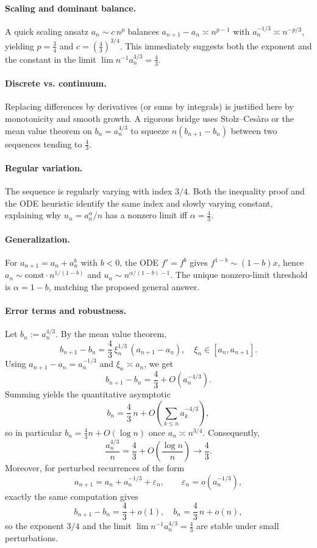 \documentclass{article}
\begin{document}
\paragraph{Scaling and dominant balance.}
A quick scaling ansatz $a_n \sim c\,n^p$ balances $a_{n+1}-a_n \asymp n^{p-1}$ with $a_n^{-1/3} \asymp n^{-p/3}$, yielding $p=\tfrac{3}{4}$ and $c=(\tfrac{4}{3})^{3/4}$. This immediately suggests both the exponent and the constant in the limit $\lim n^{-1}a_n^{4/3}=\tfrac{4}{3}$.

\paragraph{Discrete vs. continuum.}
Replacing differences by derivatives (or sums by integrals) is justified here by monotonicity and smooth growth. A rigorous bridge uses Stolz–Cesàro or the mean value theorem on $b_n=a_n^{4/3}$ to squeeze $n(b_{n+1}-b_n)$ between two sequences tending to $\tfrac{4}{3}$.

\paragraph{Regular variation.}
The sequence is regularly varying with index $3/4$. Both the inequality proof and the ODE heuristic identify the same index and slowly varying constant, explaining why $u_n=a_n^\alpha/n$ has a nonzero limit iff $\alpha=\tfrac{4}{3}$.

\paragraph{Generalization.}
For $a_{n+1}=a_n+a_n^b$ with $b<0$, the ODE $f'=f^b$ gives $f^{1-b}\sim (1-b)x$, hence $a_n\sim \text{const}\cdot n^{1/(1-b)}$ and $u_n\sim n^{\alpha/(1-b)-1}$. The unique nonzero-limit threshold is $\alpha=1-b$, matching the proposed general answer.

\paragraph{Error terms and robustness.}
Let $b_n:=a_n^{4/3}$. By the mean value theorem,
$$b_{n+1}-b_n=\frac{4}{3}\,\xi_n^{1/3}\,(a_{n+1}-a_n),\quad \xi_n\in[a_n,a_{n+1}].$$
Using $a_{n+1}-a_n=a_n^{-1/3}$ and $\xi_n\asymp a_n$, we get
$$b_{n+1}-b_n=\frac{4}{3}+O\!\left(a_n^{-4/3}\right).$$
Summing yields the quantitative asymptotic
$$b_n=\frac{4}{3}\,n+O\!\left(\sum_{k\le n} a_k^{-4/3}\right),$$
so in particular $b_n=\tfrac{4}{3}n+O(\log n)$ once $a_n\asymp n^{3/4}$. Consequently,
$$\frac{a_n^{4/3}}{n}=\frac{4}{3}+O\!\left(\frac{\log n}{n}\right)\to\frac{4}{3}.$$
Moreover, for perturbed recurrences of the form
$$a_{n+1}=a_n+a_n^{-1/3}+\varepsilon_n,\qquad \varepsilon_n=o\!\left(a_n^{-1/3}\right),$$
exactly the same computation gives
$$b_{n+1}-b_n=\frac{4}{3}+o(1),\quad b_n=\frac{4}{3}\,n+o(n),$$
so the exponent $3/4$ and the limit $\lim n^{-1}a_n^{4/3}=\tfrac{4}{3}$ are stable under small perturbations.
\end{document}
